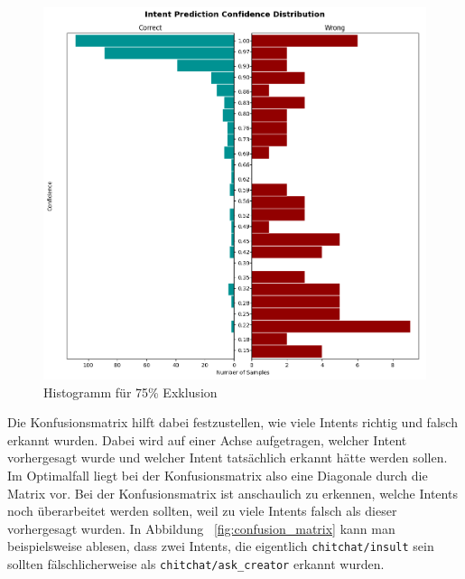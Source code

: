 \begin{figure}[hbt!]
    \centering
    \includegraphics[scale=0.6]{pics/intent_histogram_75}
    \caption{Histogramm für 75\% Exklusion}
    \label{fig:histogram_75}
\end{figure}

Die Konfusionsmatrix hilft dabei festzustellen, wie viele Intents richtig und falsch erkannt wurden.
Dabei wird auf einer Achse aufgetragen, welcher Intent vorhergesagt wurde und welcher Intent tatsächlich erkannt hätte werden sollen.
Im Optimalfall liegt bei der Konfusionsmatrix also eine Diagonale durch die Matrix vor.
Bei der Konfusionsmatrix ist anschaulich zu erkennen, welche Intents noch überarbeitet werden sollten, weil zu viele Intents falsch als dieser vorhergesagt wurden.
In Abbildung ~\ref{fig:confusion_matrix} kann man beispielsweise ablesen, dass zwei Intents, die eigentlich \texttt{chitchat/insult} sein sollten fälschlicherweise als \texttt{chitchat/ask\_creator} erkannt wurden.

